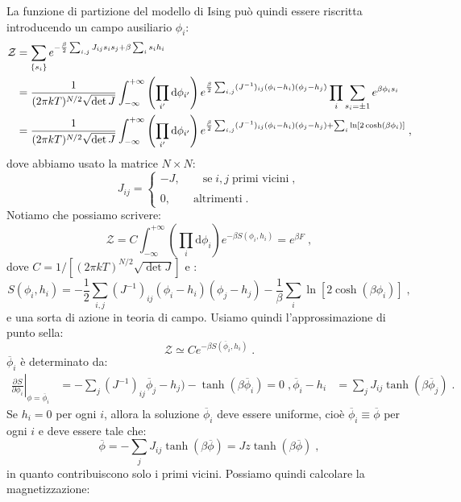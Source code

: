 \documentclass[10pt,a4paper]{report}
\theoremstyle{definition}
\newcommand{\pdev}[3][]{\frac{\partial^{#1} #2}{\partial #3^{#1}}}
\numberwithin{equation}{section}
\newcommand{\diff}[1][]{\mathrm{d}#1}
\newcommand{\zpart}{\mathcal{Z}}
\begin{document}
La funzione di partizione del modello di Ising può quindi  essere riscritta introducendo un campo ausiliario $\phi_i$:
\begin{align}
\zpart &= \sum_{\{s_i\}}e^{-\frac{\beta}{2}\sum_{i,j}J_{ij}s_is_j+\beta\sum_is_ih_i} \notag \\
&= \frac{1}{(2\pi kT)^{N/2}\sqrt{\det J}}\int_{-\infty}^{+\infty}\left(\prod_{i'}\diff{\phi_{i'}}\right)e^{\frac{\beta}{2}\sum_{i,j}(J^{-1})_{ij}(\phi_i-h_i)(\phi_j-h_j)}\prod_i\sum_{s_i=\pm 1}e^{\beta\phi_is_i} \notag \\
&= \frac{1}{(2\pi kT)^{N/2}\sqrt{\det J}}\int_{-\infty}^{+\infty}\left(\prod_{i'}\diff{\phi_{i'}}\right)e^{\frac{\beta}{2}\sum_{i,j}(J^{-1})_{ij}(\phi_i-h_i)(\phi_j-h_j)+\sum_i\ln[2\cosh(\beta \phi_i)]}\;,
\end{align}
dove abbiamo usato la matrice $N\times N$:
\begin{equation}
J_{ij}=\begin{cases}
-J,\qquad \mbox{se}\; i,j\;\mbox{primi vicini}\;, \\
\\
0,\qquad \mbox{altrimenti}\;.
\end{cases}
\end{equation}
Notiamo che possiamo scrivere:
$$
\zpart=C\int_{-\infty}^{+\infty}\left(\prod_i\diff{\phi_i}\right)e^{-\beta S(\phi_i,h_i)}=e^{\beta F}\;,
$$
dove $C=1/[(2\pi kT)^{N/2}\sqrt{\det J}]$ e :
\begin{equation}
S(\phi_i,h_i)=-\frac{1}{2}\sum_{i,j}(J^{-1})_{ij}(\phi_i-h_i)(\phi_j-h_j)-\frac{1}{\beta}\sum_i\ln[2\cosh(\beta \phi_i)]\;,
\end{equation}
e una sorta di azione in teoria di campo. Usiamo quindi l'approssimazione di punto sella:
$$
\zpart\simeq Ce^{-\beta S(\overline{\phi}_i,h_i)}\;.
$$
$\overline{\phi}_i$ è determinato da:
\begin{align*}
\left.\pdev{S}{\phi_i}\right|_{\phi=\overline{\phi}_i}&=-\sum_j(J^{-1})_{ij}\overline{\phi}_j-h_j)-\tanh(\beta\overline{\phi}_i)=0\;,
\overline{\phi}_i-h_i &= \sum_j J_{ij}\tanh(\beta\overline{\phi}_j)\;.
\end{align*}
Se $h_i=0$ per ogni $i$, allora la soluzione $\overline{\phi}_i$ deve essere uniforme, cioè $\overline{\phi}_i\equiv\overline{\phi}$ per ogni $i$ e deve essere tale che:
\begin{equation}
\overline{\phi}=-\sum_jJ_{ij}\tanh(\beta\overline{\phi})=Jz\tanh(\beta\overline{\phi})\;,
\end{equation}
in quanto contribuiscono solo i primi vicini. Possiamo quindi calcolare la magnetizzazione:
\end{document}

